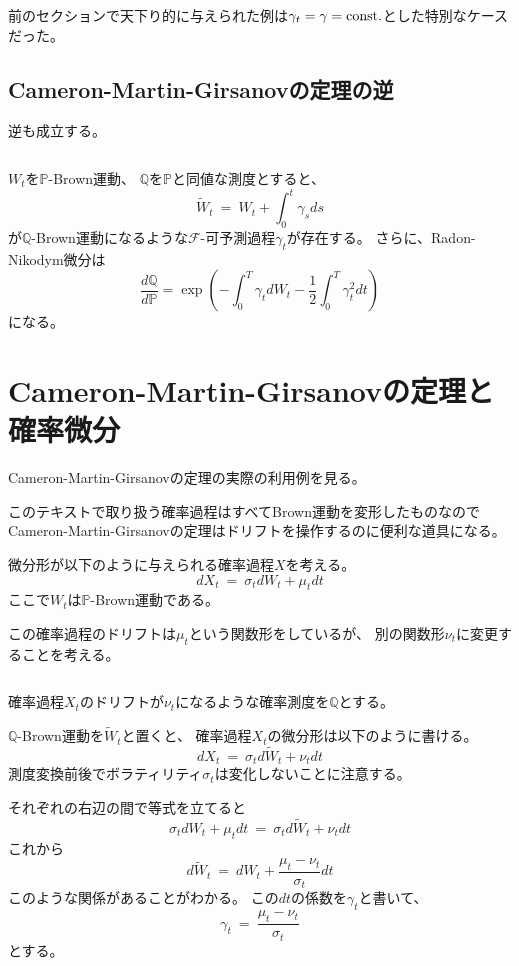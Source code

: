 \documentclass[uplatex,a4j,12pt,dvipdfmx]{jsarticle}
\begin{document}
${}$

前のセクションで天下り的に与えられた例は$\gamma_{t} = \gamma = {\rm const.}$とした特別なケースだった。

\subsection{Cameron-Martin-Girsanovの定理の逆}

逆も成立する。

${}$

$W_{t}$を$\mathbb{P}$-Brown運動、
$\mathbb{Q}$を$\mathbb{P}$と同値な測度とすると、
$$
	\tilde{W}_{t}
	\ = \
	W_{t} + \int^{t}_{0} \gamma_{s} ds
$$
が$\mathbb{Q}$-Brown運動になるような$\mathcal{F}$-可予測過程$\gamma_{t}$が存在する。
さらに、Radon-Nikodym微分は
$$
	\dfrac{ d \mathbb{Q} }{ d \mathbb{P} } = \exp \left( - \int^{T}_{0} \gamma_{t} dW_{t} - \dfrac{1}{2} \int^{T}_{0} \gamma_{t}^{2} dt \right)
$$
になる。

\section{Cameron-Martin-Girsanovの定理と確率微分}

Cameron-Martin-Girsanovの定理の実際の利用例を見る。

このテキストで取り扱う確率過程はすべてBrown運動を変形したものなので
Cameron-Martin-Girsanovの定理はドリフトを操作するのに便利な道具になる。

微分形が以下のように与えられる確率過程$X$を考える。
$$
	dX_{t}
	\ = \
	\sigma_{t} dW_{t}
	+
	\mu_{t} dt
$$
ここで$W_{t}$は$\mathbb{P}$-Brown運動である。

この確率過程のドリフトは$\mu_{t}$という関数形をしているが、
別の関数形$\nu_{t}$に変更することを考える。

${}$

確率過程$X_{t}$のドリフトが$\nu_{t}$になるような確率測度を$\mathbb{Q}$とする。

$\mathbb{Q}$-Brown運動を$\tilde{W}_{t}$と置くと、
確率過程$X_{t}$の微分形は以下のように書ける。
$$
	dX_{t}
	\ = \
	\sigma_{t} d \tilde{W}_{t}
	+
	\nu_{t} dt
$$
測度変換前後でボラティリティ$\sigma_{t}$は変化しないことに注意する。

それぞれの右辺の間で等式を立てると
$$
	\sigma_{t} dW_{t}
	+
	\mu_{t} dt
	\ = \
	\sigma_{t} d \tilde{W}_{t}
	+
	\nu_{t} dt
$$
これから
$$
	d \tilde{W}_{t}
	\ = \
	d W_{t}
	+
	\dfrac{ \mu_{t} - \nu_{t} }{\sigma_{t}}
	dt
$$
このような関係があることがわかる。
この$dt$の係数を$\gamma_{t}$と書いて、
$$
	\gamma_{t}
	\ = \
	\dfrac{ \mu_{t} - \nu_{t} }{\sigma_{t}}
$$
とする。
\end{document}
